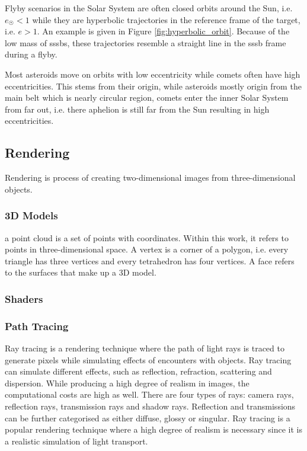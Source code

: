 Flyby scenarios in the Solar System are often closed orbits around the Sun, i.e. $e_{\astrosun} < 1$ while they are hyperbolic trajectories in the reference frame of the target, i.e. $e > 1$. An example is given in Figure \ref{fig:hyperbolic_orbit}. Because of the low mass of \glspl{sssb}, these trajectories resemble a straight line in the \gls{sssb} frame during a flyby.

Most asteroids move on orbits with low eccentricity while comets often have high eccentricities. This stems from their origin, while asteroids mostly origin from the main belt which is nearly circular region, comets enter the inner Solar System from far out, i.e. there aphelion is still far from the Sun resulting in high eccentricities.

\subsection{Rendering}
Rendering is process of creating two-dimensional images from three-dimensional objects.

\subsubsection{3D Models}
a point cloud is a set of points with coordinates. Within this work, it refers to points in three-dimensional space.
A vertex is a corner of a polygon, i.e. every triangle has three vertices and every tetrahedron has four vertices. A face refers to the surfaces that make up a 3D model.

\subsubsection{Shaders}


\subsubsection{Path Tracing}
Ray tracing is a rendering technique where the path of light rays is traced to generate pixels while simulating effects of encounters with objects. Ray tracing can simulate different effects, such as reflection, refraction, scattering and dispersion. While producing a high degree of realism in images, the computational costs are high as well. There are four types of rays: camera rays, reflection rays, transmission rays and shadow rays. Reflection and transmissions can be further categorised as either diffuse, glossy or singular. Ray tracing is a popular rendering technique where a high degree of realism is necessary since it is a realistic simulation of light transport.

